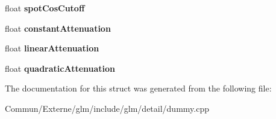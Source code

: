 \begin{DoxyCompactItemize}
\item 
float {\bfseries spot\+Cos\+Cutoff}\hypertarget{structlight_a25376f0a1e32235d50ef14edfa18bfb3}{}\label{structlight_a25376f0a1e32235d50ef14edfa18bfb3}

\item 
float {\bfseries constant\+Attenuation}\hypertarget{structlight_a788e3a9fbc05cd748dd6a181b6043892}{}\label{structlight_a788e3a9fbc05cd748dd6a181b6043892}

\item 
float {\bfseries linear\+Attenuation}\hypertarget{structlight_aea11b1222a4d5c42f5d69e31751e6fac}{}\label{structlight_aea11b1222a4d5c42f5d69e31751e6fac}

\item 
float {\bfseries quadratic\+Attenuation}\hypertarget{structlight_afe2993ec0463d57b374b8f5a27f2dfa7}{}\label{structlight_afe2993ec0463d57b374b8f5a27f2dfa7}

\end{DoxyCompactItemize}


The documentation for this struct was generated from the following file\+:\begin{DoxyCompactItemize}
\item 
Commun/\+Externe/glm/include/glm/detail/dummy.\+cpp\end{DoxyCompactItemize}
